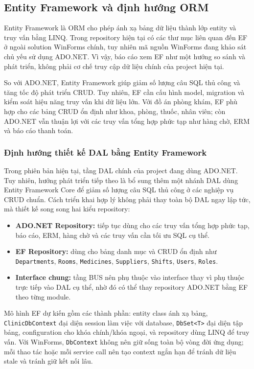 \documentclass[12pt,a4paper]{article}
\numberwithin{figure}{subsection}
\numberwithin{table}{subsection}
\begin{document}
\subsection{Entity Framework và định hướng ORM}

Entity Framework là ORM cho phép ánh xạ bảng dữ liệu thành lớp entity và truy vấn bằng LINQ. Trong repository hiện tại có các thư mục liên quan đến EF ở ngoài solution WinForms chính, tuy nhiên mã nguồn WinForms đang khảo sát chủ yếu sử dụng ADO.NET. Vì vậy, báo cáo xem EF như một hướng so sánh và phát triển, không phải cơ chế truy cập dữ liệu chính của project hiện tại.

So với ADO.NET, Entity Framework giúp giảm số lượng câu SQL thủ công và tăng tốc độ phát triển CRUD. Tuy nhiên, EF cần cấu hình model, migration và kiểm soát hiệu năng truy vấn khi dữ liệu lớn. Với đồ án phòng khám, EF phù hợp cho các bảng CRUD ổn định như khoa, phòng, thuốc, nhân viên; còn ADO.NET vẫn thuận lợi với các truy vấn tổng hợp phức tạp như hàng chờ, ERM và báo cáo thanh toán.

\subsubsection{Định hướng thiết kế DAL bằng Entity Framework}

Trong phiên bản hiện tại, tầng DAL chính của project đang dùng ADO.NET. Tuy nhiên, hướng phát triển tiếp theo là bổ sung thêm một nhánh DAL dùng Entity Framework Core để giảm số lượng câu SQL thủ công ở các nghiệp vụ CRUD chuẩn. Cách triển khai hợp lý không phải thay toàn bộ DAL ngay lập tức, mà thiết kế song song hai kiểu repository:

\begin{itemize}
    \item \textbf{ADO.NET Repository:} tiếp tục dùng cho các truy vấn tổng hợp phức tạp, báo cáo, ERM, hàng chờ và các truy vấn cần tối ưu SQL cụ thể.
    \item \textbf{EF Repository:} dùng cho bảng danh mục và CRUD ổn định như \texttt{Departments}, \texttt{Rooms}, \texttt{Medicines}, \texttt{Suppliers}, \texttt{Shifts}, \texttt{Users}, \texttt{Roles}.
    \item \textbf{Interface chung:} tầng BUS nên phụ thuộc vào interface thay vì phụ thuộc trực tiếp vào DAL cụ thể, nhờ đó có thể thay repository ADO.NET bằng EF theo từng module.
\end{itemize}

Mô hình EF dự kiến gồm các thành phần: entity class ánh xạ bảng, \texttt{ClinicDbContext} đại diện session làm việc với database, \texttt{DbSet<T>} đại diện tập bảng, configuration cho khóa chính/khóa ngoại, và repository dùng LINQ để truy vấn. Với WinForms, \texttt{DbContext} không nên giữ sống toàn bộ vòng đời ứng dụng; mỗi thao tác hoặc mỗi service call nên tạo context ngắn hạn để tránh dữ liệu stale và tránh giữ kết nối lâu.
\end{document}
